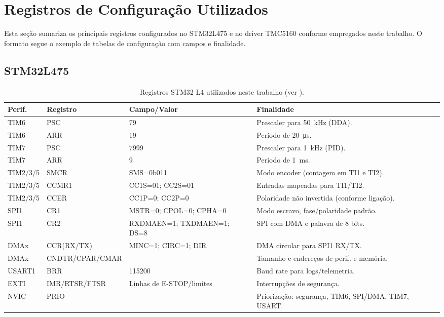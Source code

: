 \FloatBarrier
\section{Registros de Configura\c{c}\~ao Utilizados}

Esta se\c{c}\~ao sumariza os principais registros configurados no STM32L475 e
no driver TMC5160 conforme empregados neste trabalho. O formato segue o
exemplo de tabelas de configura\c{c}\~ao com campos e finalidade.

\subsection{STM32L475}

\begin{table}[H]
  \centering
  \caption{Registros STM32 L4 utilizados neste trabalho (ver \cite{st_an4013,stm32l4_rm}).}
  \label{tab:regs-stm32}
  \setlength{\tabcolsep}{4pt}\footnotesize
  \begin{tabularx}{\textwidth}{lllX}
    \toprule
    Perif. & Registro & Campo/Valor & Finalidade \\
    \midrule
    TIM6 & PSC & 79 & Prescaler para \SI{50}{kHz} (DDA). \\
    TIM6 & ARR & 19 & Per\'iodo de \SI{20}{\micro s}. \\
    TIM7 & PSC & 7999 & Prescaler para \SI{1}{kHz} (PID). \\
    TIM7 & ARR & 9 & Per\'iodo de \SI{1}{ms}. \\
    TIM2/3/5 & SMCR & SMS=0b011 & Modo encoder (contagem em TI1 e TI2). \\
    TIM2/3/5 & CCMR1 & CC1S=01; CC2S=01 & Entradas mapeadas para TI1/TI2. \\
    TIM2/3/5 & CCER & CC1P=0; CC2P=0 & Polaridade n\~ao invertida (conforme liga\c{c}\~ao). \\
    SPI1 & CR1 & MSTR=0; CPOL=0; CPHA=0 & Modo escravo, fase/polaridade padr\~ao. \\
    SPI1 & CR2 & RXDMAEN=1; TXDMAEN=1; DS=8 & SPI com DMA e palavra de 8 bits. \\
    DMAx & CCR(RX/TX) & MINC=1; CIRC=1; DIR & DMA circular para SPI1 RX/TX. \\
    DMAx & CNDTR/CPAR/CMAR & -- & Tamanho e endere\c{c}os de perif. e mem\'oria. \\
    USART1 & BRR & 115200 & Baud rate para logs/telemetria. \\
    EXTI & IMR/RTSR/FTSR & Linhas de E-STOP/limites & Interrup\c{c}\~oes de seguran\c{c}a. \\
    NVIC & PRIO & -- & Prioriza\c{c}\~ao: seguran\c{c}a, TIM6, SPI/DMA, TIM7, USART. \\
    \bottomrule
  \end{tabularx}
\end{table}

